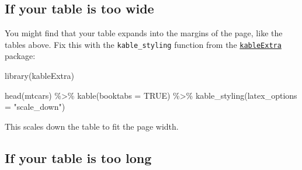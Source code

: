 \documentclass[a4paper, twoside]{templates/ociamthesis}
\newenvironment{Shaded}{\begin{snugshade}}{\end{snugshade}}
\newcommand{\AttributeTok}[1]{\textcolor[rgb]{0.77,0.63,0.00}{#1}}
\newcommand{\ConstantTok}[1]{\textcolor[rgb]{0.00,0.00,0.00}{#1}}
\newcommand{\FunctionTok}[1]{\textcolor[rgb]{0.00,0.00,0.00}{#1}}
\newcommand{\NormalTok}[1]{#1}
\newcommand{\SpecialCharTok}[1]{\textcolor[rgb]{0.00,0.00,0.00}{#1}}
\newcommand{\StringTok}[1]{\textcolor[rgb]{0.31,0.60,0.02}{#1}}
\renewenvironment{Shaded}
{
  \vspace{10pt}%
  \begin{snugshade}%
}{%
  \end{snugshade}%
  \vspace{8pt}%
}
\begin{document}
\hypertarget{if-your-table-is-too-wide}{%
\subsection{If your table is too wide}\label{if-your-table-is-too-wide}}

You might find that your table expands into the margins of the page, like the tables above.
Fix this with the \texttt{kable\_styling} function from the \href{https://haozhu233.github.io/kableExtra/}{\texttt{kableExtra}} package:

\begin{Shaded}
\begin{Highlighting}[]
\FunctionTok{library}\NormalTok{(kableExtra)}

\FunctionTok{head}\NormalTok{(mtcars) }\SpecialCharTok{\%\textgreater{}\%} 
  \FunctionTok{kable}\NormalTok{(}\AttributeTok{booktabs =} \ConstantTok{TRUE}\NormalTok{) }\SpecialCharTok{\%\textgreater{}\%} 
  \FunctionTok{kable\_styling}\NormalTok{(}\AttributeTok{latex\_options =} \StringTok{"scale\_down"}\NormalTok{)}
\end{Highlighting}
\end{Shaded}

\begin{table}
\centering
{}
\end{table}

This scales down the table to fit the page width.

\hypertarget{if-your-table-is-too-long}{%
\subsection{If your table is too long}\label{if-your-table-is-too-long}}
\end{document}
